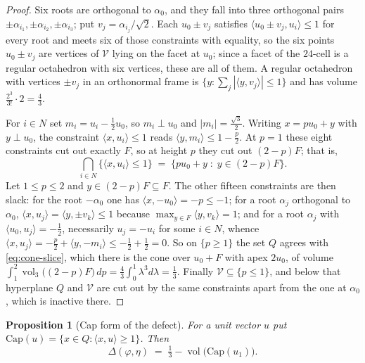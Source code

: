 \documentclass[11pt,reqno]{amsart}
\renewcommand{\_}{\origunderscore\allowbreak}
\numberwithin{equation}{section}
\theoremstyle{plain}
\newtheorem{prop}[thm]{Proposition}
\theoremstyle{definition}
\theoremstyle{remark}
\newcommand{\VCell}{\mathcal{V}}             %
\newcommand{\tilt}{\varphi}                  %
\newcommand{\dev}{\eta}                      %
\newcommand{\defect}{\Delta}                 %
\newcommand{\base}{u}                        %
\newcommand{\capQ}{\mathrm{Cap}}             %
\DeclareMathOperator{\vol}{vol}
\begin{document}
\begin{proof}
Six roots are orthogonal to $\alpha_0$, and they fall into three
orthogonal pairs $\pm\alpha_{i_1},\pm\alpha_{i_2},\pm\alpha_{i_3}$; put
$v_j=\alpha_{i_j}/\sqrt2$. Each $\base_0\pm v_j$ satisfies $\langle
\base_0\pm v_j,\base_i\rangle\le1$ for every root and meets six of those
constraints with equality, so the six points $\base_0\pm v_j$ are
vertices of $\VCell$ lying on the facet at $\base_0$; since a facet of the
$24$-cell is a regular octahedron with six vertices, these are all of
them. A regular octahedron with vertices $\pm v_j$ in an orthonormal frame
is $\{y:\sum_j|\langle y,v_j\rangle|\le1\}$ and has volume
$\tfrac{2^3}{3!}\cdot 2=\tfrac43$.

For $i\in N$ set $m_i=\base_i-\tfrac12\base_0$, so $m_i\perp\base_0$ and
$|m_i|=\tfrac{\sqrt3}{2}$. Writing $x=p\base_0+y$ with $y\perp\base_0$,
the constraint $\langle x,\base_i\rangle\le1$ reads $\langle
y,m_i\rangle\le1-\tfrac p2$. At $p=1$ these eight constraints cut out
exactly $F$, so at height $p$ they cut out $(2-p)F$; that is,
\begin{equation}\label{eq:cone-slice}
  \bigcap_{i\in N}\{\langle x,\base_i\rangle\le1\}
  \;=\;\bigl\{p\base_0+y \;:\; y\in(2-p)F\bigr\}.
\end{equation}
Let $1\le p\le2$ and $y\in(2-p)F\subseteq F$. The other fifteen
constraints are then slack: for the root $-\alpha_0$ one has $\langle
x,-\base_0\rangle=-p\le-1$; for a root $\alpha_j$ orthogonal to $\alpha_0$,
$\langle x,\base_j\rangle=\langle y,\pm v_k\rangle\le1$ because
$\max_{y\in F}\langle y,v_k\rangle=1$; and for a root $\alpha_j$ with
$\langle\base_0,\base_j\rangle=-\tfrac12$, necessarily $\base_j=-\base_i$
for some $i\in N$, whence $\langle x,\base_j\rangle=-\tfrac
p2+\langle y,-m_i\rangle\le-\tfrac12+\tfrac12=0$. So on $\{p\ge1\}$ the
set $Q$ agrees with \cref{eq:cone-slice}, which there is the cone over
$\base_0+F$ with apex $2\base_0$, of volume
$\int_1^2\vol_3\bigl((2-p)F\bigr)\,dp=\tfrac43\int_0^1\lambda^3d\lambda
=\tfrac13$. Finally $\VCell\subseteq\{p\le1\}$, and below that hyperplane
$Q$ and $\VCell$ are cut out by the same constraints apart from the one at
$\alpha_0$, which is inactive there.
\end{proof}

\begin{prop}[Cap form of the defect]\label{prop:cap-reformulation}
For a unit vector $u$ put $\capQ(u)=\{x\in Q:\langle x,u\rangle\ge1\}$.
Then
\[
  \defect(\tilt,\dev)\;=\;\tfrac13-\vol\bigl(\capQ(\base_1)\bigr).
\]
\end{prop}
\end{document}
